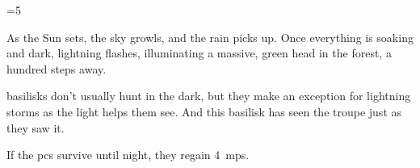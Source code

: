 \ifnum\value{cycle}=5


\begin{boxtext}
  As the Sun sets, the sky growls, and the rain picks up.
  Once everything is soaking and dark, lightning flashes, illuminating a massive, green head in the forest, a hundred \glspl{step} away.
\end{boxtext}

\Glspl{basilisk} don't usually hunt in the dark, but they make an exception for lightning storms as the light helps them see.
And this \gls{basilisk} has seen the troupe just as they saw it.

\basilisk

If the \glspl{pc} survive until night, they regain 4~\glspl{mp}.

\fi
